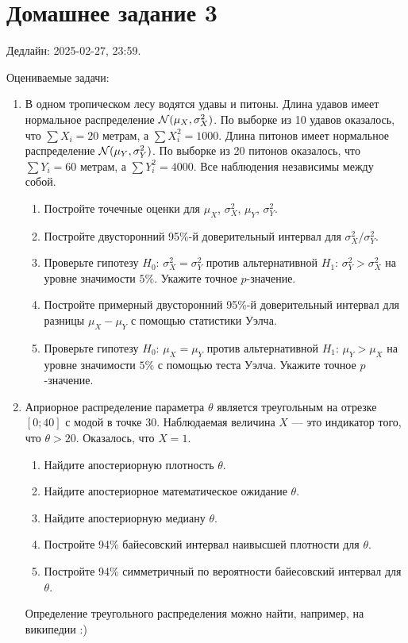 
\section*{Домашнее задание 3}

Дедлайн: 2025-02-27, 23:59.

Оцениваемые задачи:

\begin{enumerate}
\item В одном тропическом лесу водятся удавы и питоны. 
    Длина удавов имеет нормальное распределение $\mathcal{N}(\mu_X, \sigma^2_X)$. 
    По выборке из 10 удавов оказалось, что $\sum X_i = 20$ метрам, а $\sum X_i^2 = 1000$. 
    Длина питонов имеет нормальное распределение $\mathcal{N}(\mu_Y, \sigma^2_Y)$. 
    По выборке из 20 питонов оказалось, что $\sum Y_i = 60$ метрам, а $\sum Y_i^2 = 4000$.
    Все наблюдения независимы между собой. 
    \begin{enumerate}
      \item Постройте точечные оценки для $\mu_X$, $\sigma^2_X$, $\mu_Y$, $\sigma^2_Y$.
      \item Постройте двусторонний 95\%-й доверительный интервал для $\sigma^2_X/\sigma^2_Y$.
      \item Проверьте гипотезу $H_0$: $\sigma^2_X = \sigma^2_Y$ против альтернативной $H_1$: $\sigma^2_Y > \sigma^2_X$ на уровне значимости $5\%$.
      Укажите точное $p$-значение.
      \item Постройте примерный двусторонний 95\%-й доверительный интервал для разницы  $\mu_X - \mu_Y$ с помощью статистики Уэлча.
      \item Проверьте гипотезу $H_0$: $\mu_X = \mu_Y$ против альтернативной $H_1$: $\mu_Y > \mu_X$ на уровне значимости $5\%$ с помощью теста Уэлча.
      Укажите точное $p$-значение.
    \end{enumerate}
     
    

\item Априорное распределение параметра $\theta$ является треугольным на отрезке $[0; 40]$ с модой в точке $30$. 
Наблюдаемая величина $X$ — это индикатор того, что $\theta > 20$.
Оказалось, что $X = 1$.
    \begin{enumerate}
        \item Найдите апостериорную плотность $\theta$.
        \item Найдите апостериорное математическое ожидание $\theta$.
        \item Найдите апостериорную медиану $\theta$.
        \item Постройте 94\% байесовский интервал наивысшей плотности для $\theta$.
        \item Постройте 94\% симметричный по вероятности байесовский интервал для $\theta$.
    \end{enumerate}

Определение треугольного распределения можно найти, например, на википедии :)

\end{enumerate}

